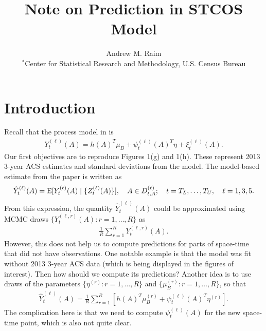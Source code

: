 \documentclass[10pt]{article}
\title{Note on Prediction in STCOS Model}
\author{Andrew M. Raim
\vspace{0.5em} \\
$^*$Center for Statistical Research and Methodology, U.S. Census Bureau
}
\begin{document}
\maketitle

\section{Introduction}
\label{sec:intro}
Recall that the process model in \citet{BradleyEtAl2016-STAT} is
%
\begin{align*}
Y_t^{(\ell)}(A) = h(A)^T \mu_B + \psi_t^{(\ell)}(A)^T \eta + \xi_t^{(\ell)}(A).
\end{align*}
%
Our first objectives are to reproduce Figures 1(g) and 1(h). These represent 2013 3-year ACS estimates and standard deviations from the model. The model-based estimate from the paper is written as
%
\begin{align*}
\hat{Y}_t^{(\ell)}(A) = \operatorname{E}[ Y_t^{(\ell)}(A) \mid \{ Z_t^{(\ell)}(A) \} ],
\quad A \in D_{t,A}^{(\ell)};
\quad t = T_L, \ldots, T_U, 
\quad \ell = 1,3,5.
\end{align*}
%
From this expression, the quantity $\hat{Y}_t^{(\ell)}(A)$ could be approximated using MCMC draws $\{ Y_t^{(\ell, r)}(A) : r = 1, \ldots, R \}$ as
%
\begin{align*}
\frac{1}{R} \sum_{r=1}^R Y_t^{(\ell, r)}(A).
\end{align*}
%
However, this does not help us to compute predictions for parts of space-time that did not have observations. One notable example is that the model was fit without 2013 3-year ACS data (which is being displayed in the figures of interest). Then how should we compute its predictions? Another idea is to use draws of the parameters $\{ \eta^{(r)} : r = 1, \ldots, R \}$ and $\{ \mu_B^{(r)} : r = 1, \ldots, R \}$, so that
%
\begin{align*}
\hat{Y}_t^{(\ell)}(A) = \frac{1}{R} \sum_{r=1}^R \left[ h(A)^T \mu_B^{(r)} + \psi_t^{(\ell)}(A)^T \eta^{(r)} \right].
\end{align*}
%
The complication here is that we need to compute $\psi_t^{(\ell)}(A)$ for the new space-time point, which is also not quite clear.





%
\end{document}
